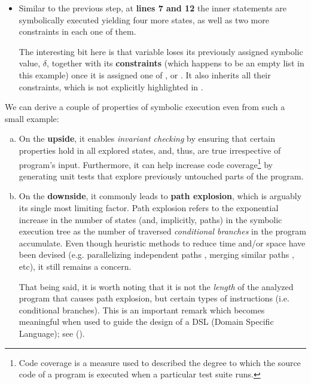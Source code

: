 \begin{itemize}
  \item Similar to the previous step, at \textbf{lines 7 and 12} the inner
     statements are symbolically executed yielding four
    more states, as well as two more constraints in each one of them.

    The interesting bit here is that variable \vmax{} loses its previously
    assigned symbolic value, $\delta$, together with its \textbf{constraints}
    (which happens to be an empty list in this example) once it is assigned one
    of \pa{}, \pb{} or \pc{}.  It also inherits all their constraints, which is
    not explicitly highlighted in .
\end{itemize}

We can derive a couple of properties of symbolic execution even from such a
small example:
\begin{enumerate}[a)]
  \item On the \textbf{upside}, it enables \emph{invariant checking} by
    ensuring that certain properties hold in all explored states, and, thus,
    are true irrespective of program's input.  Furthermore, it can help
    increase code coverage\footnote{Code coverage is a measure used to
    described the degree to which the source code of a program is executed when
    a particular test suite runs.} by generating unit tests that explore
    previously untouched parts of the program.

  \item On the \textbf{downside}, it commonly leads to \textbf{path explosion},
    which is arguably its single most limiting factor. Path explosion refers to
    the exponential increase in the number of states (and, implicitly, paths)
    in the symbolic execution tree as the number of traversed \emph{conditional
    branches} in the program accumulate. Even though heuristic methods to
    reduce time and/or space have been devised (e.g. parallelizing independent
    paths \cite{staats2010parallel}, merging similar paths
    \cite{kuznetsov2012efficient}, etc), it still remains a concern.

    That being said, it is worth noting that it is not the \emph{length} of the
    analyzed program that causes path explosion, but certain types of
    instructions (i.e.  conditional branches).  This is an important remark
    which becomes meaningful when used to guide the design of a DSL (Domain
    Specific Language); see
    ().
\end{enumerate}


